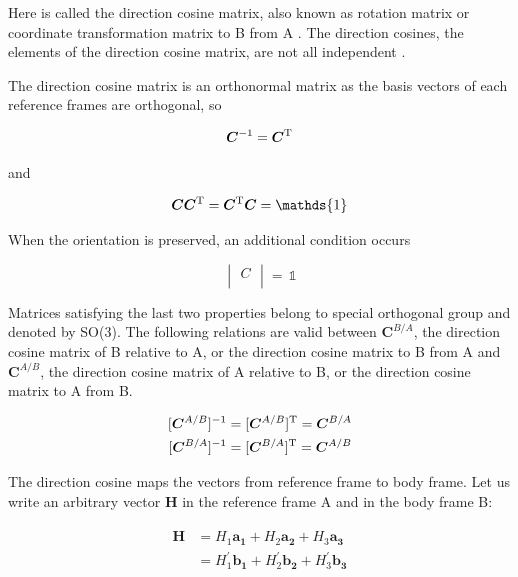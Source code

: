 Here  is called the direction cosine matrix, also known as rotation 
matrix or coordinate transformation matrix to B from A \cite{wie1998space}.  
The direction cosines, the elements of the direction cosine matrix, are not 
all independent  \cite{wie1998space}.

The direction cosine matrix is an orthonormal matrix as the basis vectors 
of each reference frames are orthogonal, so

\begin{equation}
\label{eqn:orthonormality}
\bm{C}^{-1} = \bm{C}^{\rm T}
\end{equation}

and

\begin{equation}
\label{eqn:orthonormality2}
\bm{C}\bm{C}^{\rm T} = \bm{C}^{\rm T}\bm{C} = \mathds{1}
\end{equation}

When the orientation is preserved, an additional condition occurs

\begin{equation}
\label{eqn:noRotation}
\begin{vmatrix}
C\\[0.01em]
\end{vmatrix}
=\,
\mathds{1}
\end{equation}

Matrices satisfying the last two properties belong to special orthogonal group 
and denoted by SO(3). The following relations are valid between $\bm{C}^{B/A}$, 
the direction cosine matrix of B relative to A, or the direction cosine matrix to B from A 
and $\bm{C}^{A/B}$, the direction cosine matrix of A relative to B, or the direction 
cosine matrix to A from B.

\begin{align}
\label{eqn:C_B_A_vs_C_A_B}
\begin{split}
[\bm{C}^{A/B}]^{-1} = [\bm{C}^{A/B}]^{\rm T} = \bm{C}^{B/A} 
\\
[\bm{C}^{B/A}]^{-1} = [\bm{C}^{B/A}]^{\rm T} = \bm{C}^{A/B}
\end{split}
\end{align}

The direction cosine maps the vectors from reference frame to body frame.  
Let us write an arbitrary vector $\bm{H}$ in the reference frame A and in the body frame B:

\begin{align}
\label{eqn:vectorInRefFrame}
\begin{split}
\bm{H} & = H_1 \bm{a_1} + H_2 \bm{a_2} + H_3 \bm{a_3}
\\
& = H_1^{'} \bm{b_1} + H_2^{'} \bm{b_2} + H_3^{'} \bm{b_3}
\end{split}
\end{align}


